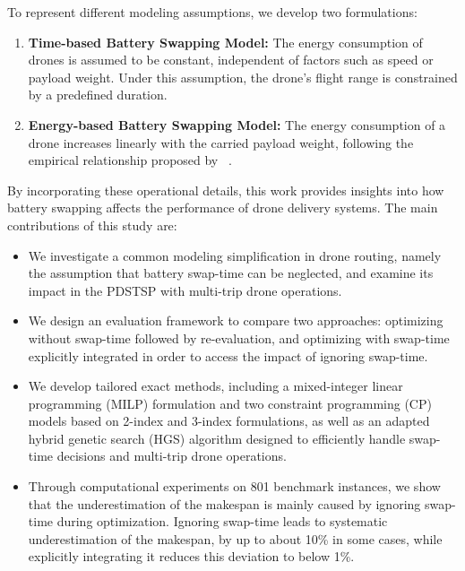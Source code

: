 \documentclass[3p, authoryear, 11pt]{elsarticle}
\begin{document}
To represent different modeling assumptions, we develop two formulations:

\begin{enumerate}
    \item \textbf{Time-based Battery Swapping Model:} The energy consumption of drones is assumed to be constant, independent of factors such as speed or payload weight. Under this assumption, the drone's flight range is constrained by a predefined duration.
    \item \textbf{Energy-based Battery Swapping Model:} The energy consumption of a drone increases linearly with the carried payload weight, following the empirical relationship proposed by ~\cite{dorling_vehicle_2017}.
\end{enumerate}

By incorporating these operational details, this work provides insights into how battery swapping affects the performance of drone delivery systems. The main contributions of this study are:

\begin{itemize}
    \item We investigate a common modeling simplification in drone routing, namely the assumption that battery swap-time can be neglected, and examine its impact in the PDSTSP with multi-trip drone operations.

    \item We design an evaluation framework to compare two approaches: optimizing without swap-time followed by re-evaluation, and optimizing with swap-time explicitly integrated in order to access the impact of ignoring swap-time.

    \item We develop tailored exact methods, including a mixed-integer linear programming (MILP) formulation and two constraint programming (CP) models based on 2-index and 3-index formulations, as well as an adapted hybrid genetic search (HGS) algorithm designed to efficiently handle swap-time decisions and multi-trip drone operations.

    \item Through computational experiments on 801 benchmark instances, we show that the underestimation of the makespan is mainly caused by ignoring swap-time during optimization. Ignoring swap-time leads to systematic underestimation of the makespan, by up to about 10\% in some cases, while explicitly integrating it reduces this deviation to below 1\%.

\end{itemize}
\end{document}
